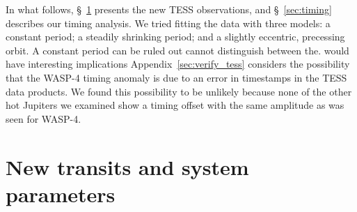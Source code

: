 \documentclass[12pt,twocolumn,tighten]{aastex62}
\begin{document}
In what follows, \S~\ref{sec:observations} presents the new TESS
observations, and \S~\ref{sec:timing} describes our timing analysis.
We tried fitting the data with three models: a constant period; a
steadily shrinking period; and a slightly eccentric, precessing orbit.
A constant period can be ruled out cannot
distinguish between the.   would have interesting implications
Appendix~\ref{sec:verify_tess} considers the possibility that the
WASP-4 timing anomaly is due to an error in timestamps in the TESS
data products.  We found this possibility to be unlikely because none
of the other hot Jupiters we examined show a timing offset with the
same amplitude as was seen for WASP-4.


\section{New transits and system parameters}
\label{sec:observations}
\end{document}
